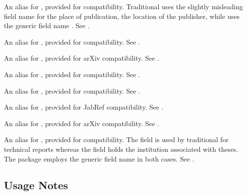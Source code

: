 \documentclass{ltxdockit}[2011/03/25]
\begin{document}
\begin{fieldlist}


An alias for , provided for \bibtex compatibility. Traditional \bibtex uses the slightly misleading field name  for the place of publication, \ie the location of the publisher, while  uses the generic field name . See .


An alias for , provided for  compatibility. See .


An alias for , provided for arXiv compatibility. See . 


An alias for , provided for \bibtex compatibility. See .


An alias for , provided for \bibtex compatibility. See .


An alias for , provided for JabRef compatibility. See .


An alias for , provided for arXiv compatibility. See . 


An alias for , provided for \bibtex compatibility. The  field is used by traditional \bibtex for technical reports whereas the  field holds the institution associated with theses. The  package employs the generic field name  in both cases. See .

\end{fieldlist}

\subsection{Usage Notes}
\label{bib:use}
\end{document}
